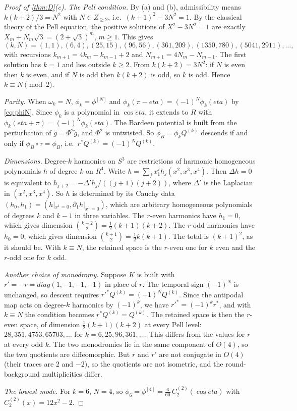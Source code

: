 \documentclass[11pt]{article}
\theoremstyle{canonmath}
\theoremstyle{canonpostulate}
\theoremstyle{canonproposition}
\theoremstyle{canonmath}
\theoremstyle{canonproposition}
\providecommand{\Klein}{\mathcal{K}}
\providecommand{\R}{\mathbb{R}}
\providecommand{\Z}{\mathbb{Z}}
\def\mathrm#1{#1}%
\def\mathbb#1{#1}%
\def\mathcal#1{#1}%
\def\eta{eta}%
\begin{document}
\begin{proof}[Proof of \cref{thm:D}(c)]
\emph{The Pell condition.} By (a) and (b), admissibility means $k(k+2)/3 = N^2$ with $N\in\Z_{\ge2}$, i.e.\ $(k+1)^2 - 3N^2 = 1$. By the classical theory of the Pell equation, the positive solutions of $X^2 - 3N^2 = 1$ are exactly $X_m + N_m\sqrt3 = (2+\sqrt3)^m$, $m\ge1$. This gives
\[
(k,N) = (1,1),(6,4),(25,15),(96,56),(361,209),(1350,780),(5041,2911),\dots,
\]
with recursions $k_{m+1} = 4k_m - k_{m-1} + 2$ and $N_{m+1} = 4N_m - N_{m-1}$. The first solution has $k = 1$ and lies outside $k\ge2$. From $k(k+2) = 3N^2$: if $N$ is even then $k$ is even, and if $N$ is odd then $k(k+2)$ is odd, so $k$ is odd. Hence $k\equiv N\pmod2$.

\emph{Parity.} When $\omega_k = N$, $\phi_k = \phi^{[N]}$ and $\phi_k(\pi-\eta) = (-1)^N\phi_k(\eta)$ by \eqref{eq:phiN}. Since $\phi_k$ is a polynomial in $\cos\eta$, it extends to $\R$ with $\phi_k(\eta+\pi) = (-1)^N\phi_k(\eta)$. The Bardeen potential is built from the perturbation of $g = \Phi^2\tilde g$, and $\Phi^2$ is untwisted. So $\phi_B = \phi_kQ^{(k)}$ descends if and only if $\phi_B\circ\tau = \phi_B$, i.e.\ $r^*Q^{(k)} = (-1)^NQ^{(k)}$.

\emph{Dimensions.} Degree-$k$ harmonics on $S^3$ are restrictions of harmonic homogeneous polynomials $h$ of degree $k$ on $\R^4$. Write $h = \sum_jx_1^jh_j(x^2,x^3,x^4)$. Then $\Delta h = 0$ is equivalent to $h_{j+2} = -\Delta'h_j/((j+1)(j+2))$, where $\Delta'$ is the Laplacian in $(x^2,x^3,x^4)$. So $h$ is determined by its Cauchy data $(h_0,h_1) = (h|_{x^1=0},\partial_1h|_{x^1=0})$, which are arbitrary homogeneous polynomials of degrees $k$ and $k-1$ in three variables. The $r$-even harmonics have $h_1 = 0$, which gives dimension $\binom{k+2}2 = \tfrac12(k+1)(k+2)$. The $r$-odd harmonics have $h_0 = 0$, which gives dimension $\binom{k+1}2 = \tfrac12k(k+1)$. The total is $(k+1)^2$, as it should be. With $k\equiv N$, the retained space is the $r$-even one for $k$ even and the $r$-odd one for $k$ odd.

\emph{Another choice of monodromy.} Suppose $\Klein$ is built with $r' = -r = \mathrm{diag}(1,-1,-1,-1)$ in place of $r$. The temporal sign $(-1)^N$ is unchanged, so descent requires $r'^*Q^{(k)} = (-1)^NQ^{(k)}$. Since the antipodal map acts on degree-$k$ harmonics by $(-1)^k$, we have $r'^* = (-1)^kr^*$, and with $k\equiv N$ the condition becomes $r^*Q^{(k)} = Q^{(k)}$. The retained space is then the $r$-even space, of dimension $\tfrac12(k+1)(k+2)$ at every Pell level: $28, 351, 4753, 65703,\dots$ for $k = 6,25,96,361,\dots$. This differs from the values for $r$ at every odd $k$. The two monodromies lie in the same component of $\mathrm{O}(4)$, so the two quotients are diffeomorphic. But $r$ and $r'$ are not conjugate in $\mathrm{O}(4)$ (their traces are $2$ and $-2$), so the quotients are not isometric, and the round-background multiplicities differ.

\emph{The lowest mode.} For $k=6$, $N=4$, so $\phi_6 = \phi^{[4]} = \tfrac{6}{60}\,C^{(2)}_2(\cos\eta)$ with $C^{(2)}_2(x) = 12x^2-2$.
\end{proof}
\end{document}
